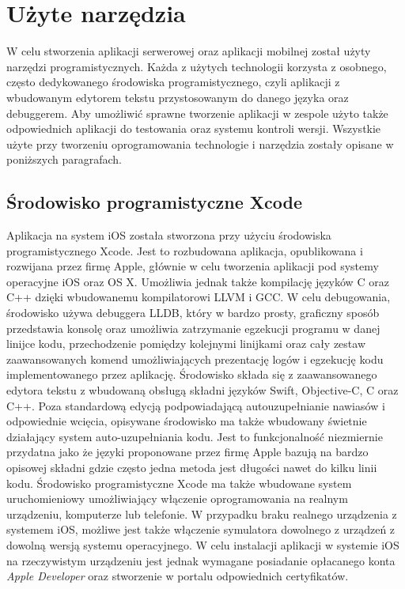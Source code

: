\section{Użyte narzędzia}

W celu stworzenia aplikacji serwerowej oraz aplikacji mobilnej został użyty narzędzi programistycznych. Każda z użytych technologii korzysta z osobnego, często dedykowanego środowiska programistycznego, czyli aplikacji z wbudowanym edytorem tekstu przystosowanym do danego języka oraz debuggerem. Aby umożliwić sprawne tworzenie aplikacji w zespole użyto także odpowiednich aplikacji do testowania oraz systemu kontroli wersji. Wszystkie użyte przy tworzeniu oprogramowania technologie i narzędzia zostały opisane w poniższych paragrafach.

\subsection{Środowisko programistyczne Xcode}

Aplikacja na system iOS została stworzona przy użyciu środowiska programistycznego Xcode. Jest to rozbudowana aplikacja, opublikowana i rozwijana przez firmę Apple, głównie w celu tworzenia aplikacji pod systemy operacyjne iOS oraz OS X. Umożliwia jednak także kompilację języków C oraz C++ dzięki wbudowanemu kompilatorowi LLVM i GCC. W celu debugowania, środowisko używa debuggera LLDB, który w bardzo prosty, graficzny sposób przedstawia konsolę oraz umożliwia zatrzymanie egzekucji programu w danej linijce kodu, przechodzenie pomiędzy kolejnymi linijkami oraz cały zestaw zaawansowanych komend umożliwiających prezentację logów i egzekucję kodu implementowanego przez aplikację. Środowisko składa się z zaawansowanego edytora tekstu z wbudowaną obsługą składni języków Swift, Objective-C, C oraz C++. Poza standardową edycją podpowiadającą autouzupełnianie nawiasów i odpowiednie wcięcia, opisywane środowisko ma także wbudowany świetnie działający system auto-uzupełniania kodu. Jest to funkcjonalność niezmiernie przydatna jako że języki proponowane przez firmę Apple bazują na bardzo opisowej składni gdzie często jedna metoda jest długości nawet do kilku linii kodu.\newline
Środowisko programistyczne Xcode ma także wbudowane system uruchomieniowy umożliwiający włączenie oprogramowania na realnym urządzeniu, komputerze lub telefonie. W przypadku braku realnego urządzenia z systemem iOS, możliwe jest także włączenie symulatora dowolnego z urządzeń z dowolną wersją systemu operacyjnego. W celu instalacji aplikacji w systemie iOS na rzeczywistym urządzeniu jest jednak wymagane posiadanie opłacanego konta \textit{Apple Developer} oraz stworzenie w portalu odpowiednich certyfikatów.

